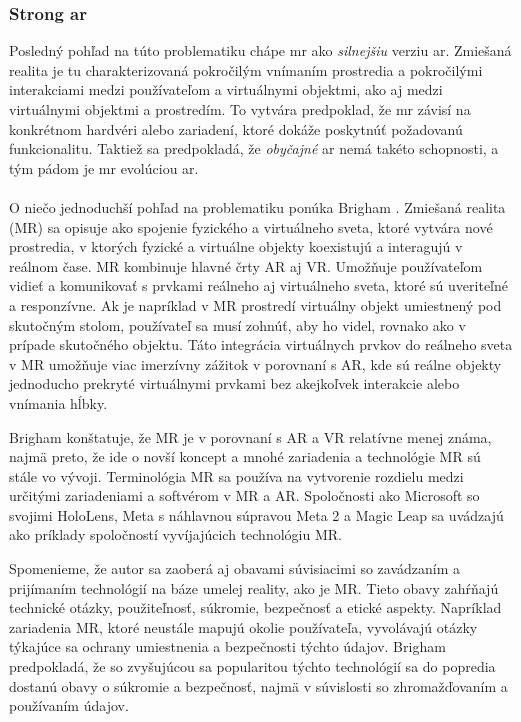 \subsubsection*{Strong \acrshort{ar}}
Posledný pohľad na túto problematiku chápe \acrshort{mr} ako \emph{silnejšiu} verziu \acrshort{ar}. Zmiešaná realita je tu charakterizovaná pokročilým vnímaním prostredia
a pokročilými interakciami medzi používateľom a virtuálnymi objektmi, ako aj medzi virtuálnymi objektmi a prostredím. To vytvára predpoklad, že \acrshort{mr} závisí
na konkrétnom hardvéri alebo zariadení, ktoré dokáže poskytnúť požadovanú funkcionalitu. Taktiež sa predpokladá, že \emph{obyčajné} \acrshort{ar} nemá takéto schopnosti,
a tým pádom je \acrshort{mr} evolúciou \acrshort{ar}. \\\\
\noindent
O niečo jednoduchší pohľad na problematiku ponúka Brigham \cite{brighamRealityCheckBasics2017}. Zmiešaná realita (MR) sa opisuje ako spojenie fyzického a virtuálneho sveta, ktoré 
vytvára nové prostredia, v ktorých fyzické a virtuálne objekty koexistujú a interagujú v reálnom čase. MR kombinuje hlavné črty AR aj VR. Umožňuje používateľom vidieť a komunikovať s 
prvkami reálneho aj virtuálneho sveta, ktoré sú uveriteľné a responzívne. Ak je napríklad v MR prostredí virtuálny objekt umiestnený pod skutočným stolom, 
používateľ sa musí zohnúť, aby ho videl, rovnako ako v prípade skutočného objektu. Táto integrácia virtuálnych prvkov do reálneho sveta v MR umožňuje viac imerzívny zážitok v porovnaní 
s AR, kde sú reálne objekty jednoducho prekryté virtuálnymi prvkami bez akejkoľvek interakcie alebo vnímania hĺbky.

Brigham konštatuje, že MR je v porovnaní s AR a VR relatívne menej známa, najmä preto, že ide o novší koncept a mnohé zariadenia a technológie MR sú stále vo vývoji. Terminológia MR sa 
používa na vytvorenie rozdielu medzi určitými zariadeniami a softvérom v MR a AR. Spoločnosti ako Microsoft so svojimi HoloLens, Meta s náhlavnou súpravou Meta 2 a Magic Leap sa uvádzajú ako 
príklady spoločností vyvíjajúcich technológiu MR.

Spomenieme, že autor sa zaoberá aj obavami súvisiacimi so zavádzaním a prijímaním technológií na báze umelej reality, ako je MR. Tieto obavy zahŕňajú technické otázky, použiteľnosť, 
súkromie, bezpečnosť a etické aspekty. Napríklad zariadenia MR, ktoré neustále mapujú okolie používateľa, vyvolávajú otázky týkajúce sa ochrany umiestnenia a bezpečnosti týchto údajov. 
Brigham predpokladá, že so zvyšujúcou sa popularitou týchto technológií sa do popredia dostanú obavy o súkromie a bezpečnosť, najmä v súvislosti so zhromažďovaním a používaním údajov.

